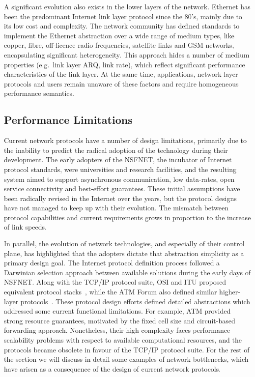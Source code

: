 A significant evolution also exists in the lower layers of the network.
Ethernet has been the predominant Internet link layer protocol since the 80's,
mainly due to its low cost and complexity. The network community has defined
standards to implement the Ethernet abstraction over a wide range of medium
types, like copper, fibre, off-licence radio frequencies, satellite links and
GSM networks, encapsulating significant heterogeneity. This approach hides a
number of medium properties (e.g.~link layer ARQ, link rate), which reflect
significant performance characteristics of the link layer. At the same time,
applications, network layer protocols and users remain unaware of these factors
and require homogeneous performance semantics. 

\subsection{Performance Limitations}\label{sec:intro:control_limitations}

Current network protocols have a number of design limitations, primarily
due to the inability to predict the radical adoption of the technology during
their development.  The early adopters of the NSFNET, the incubator  of
Internet protocol standards, were universities and research facilities, and the
resulting system aimed to support asynchronous communication, low data-rates,
open service connectivity and best-effort guarantees. These initial assumptions
have been radically revised in the Internet over the years, but the protocol
designs have not managed to keep up with their evolution. The mismatch between
protocol capabilities and current requirements grows in proportion to the
increase of link speeds.

In parallel, the evolution of network technologies, and especially of their
control plane, has highlighted that the adopters dictate that abstraction
simplicity as a primary design goal. The Internet protocol definition process
followed a Darwinian selection approach between available solutions during the
early days of NSFNET\@. Along with the TCP/IP protocol suite, OSI and ITU
proposed equivalent protocol stacks~, while the ATM Forum
also defined similar higher-layer protocols~. These protocol
design efforts defined detailed abstractions which addressed some current
functional limitations.  For example, ATM provided strong resource guarantees,
motivated by the fixed cell size and circuit-based forwarding approach.
Nonetheless, their high complexity faces performance scalability problems with
respect to available computational resources, and the protocols became obsolete
in favour of the TCP/IP protocol suite. For the rest of the section we will
discuss in detail some examples of network bottlenecks, which have arisen as a
consequence of the design of current network protocols.

